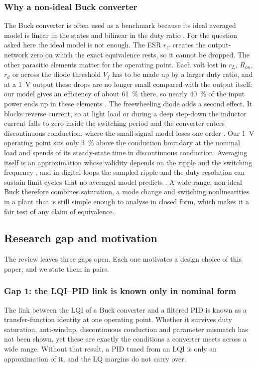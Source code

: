 \subsubsection{Why a non-ideal Buck converter}
The Buck converter is often used as a benchmark because its ideal averaged
model is linear in the states and bilinear in the duty ratio
\citep{Middlebrook1976,Erickson2020}. For the question asked here the ideal
model is not enough. The ESR $r_C$ creates the output-network zero on which the
exact equivalence rests, so it cannot be dropped. The other parasitic elements
matter for the operating point. Each volt lost in $r_L$, $R_{on}$, $r_d$ or across
the diode threshold $V_f$ has to be made up by a larger duty ratio, and at a
\SI{1}{V} output these drops are no longer small compared with the output
itself: our model gives an efficiency of about \SI{61}{\percent} there, so
nearly \SI{40}{\percent} of the input power ends up in these elements
\citep{Kazimierczuk2015,Siddhartha2018}. The freewheeling diode adds a second
effect. It blocks reverse current, so at light load or during a deep
step-down the inductor current falls to zero inside the switching period and
the converter enters discontinuous conduction, where the small-signal model
loses one order \citep{Sun2001}. Our \SI{1}{V} operating point sits only
\SI{3}{\percent} above the conduction boundary at the nominal load and spends
\DCMone{} of its steady-state time in discontinuous conduction. Averaging itself
is an approximation whose validity depends on the ripple and the switching
frequency \citep{Krein1990,Maksimovic2001}, and in digital loops the sampled
ripple and the duty resolution can sustain limit cycles that no averaged model
predicts \citep{Peterchev2003,Peng2007,Buso2015}. A wide-range, non-ideal Buck
therefore combines saturation, a mode change and switching nonlinearities in a
plant that is still simple enough to analyse in closed form, which makes it a
fair test of any claim of equivalence.

\subsection{Research gap and motivation}\label{sec:gap}
The review leaves three gaps open. Each one motivates a design choice of this
paper, and we state them in pairs.

\subsubsection{Gap 1: the LQI--PID link is known only in nominal form}
The link between the LQI of a Buck converter and a filtered PID is known as a
transfer-function identity at one operating point. Whether it survives duty
saturation, anti-windup, discontinuous conduction and parameter mismatch has
not been shown, yet these are exactly the conditions a converter meets across a
wide range. Without that result, a PID tuned from an LQI is only an
approximation of it, and the LQ margins do not carry over.

